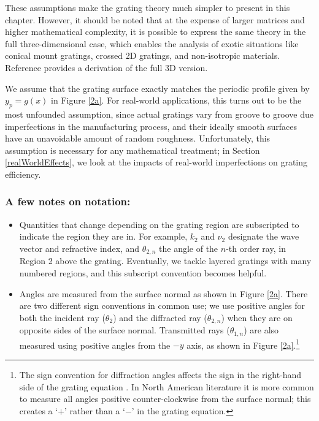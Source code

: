 These assumptions make the grating theory much simpler to present in this chapter. However, it should be noted that at the expense of larger matrices and higher mathematical complexity, it is possible to express the same theory in the full three-dimensional case, which enables the analysis of exotic situations like conical mount gratings, crossed 2D gratings, and non-isotropic materials.  Reference \cite[Chapter 5]{Nev02} provides a derivation of the full 3D version.

We assume that the grating surface exactly matches the periodic profile given by $y_p=g(x)$ in Figure \ref{2a}.  For real-world applications, this turns out to be the most unfounded assumption, since actual gratings vary from groove to groove due imperfections in the manufacturing process, and their ideally smooth surfaces have an unavoidable amount of random roughness.  Unfortunately, this assumption is necessary for any mathematical treatment; in Section \ref{realWorldEffects}, we look at the impacts of real-world  imperfections on grating efficiency.

\subsubsection{A few notes on notation:}
\begin{itemize}
\item Quantities that change depending on the grating region are subscripted to indicate the region they are in.  For example, $k_2$ and $\nu_2$ designate the wave vector and refractive index, and $\theta_{2,n}$ the angle of the $n$-th order ray, in Region 2 above the grating.  Eventually, we tackle layered gratings with many numbered regions, and this subscript convention becomes helpful.
\item Angles are measured from the surface normal as shown in Figure \ref{2a}.  There are two different sign conventions in common use; we use positive angles for both the incident ray ($\theta_2$) and the diffracted ray ($\theta_{2,n}$) when they are on opposite sides of the surface normal.  Transmitted rays ($\theta_{1,n}$) are also measured using positive angles from the $-y$ axis, as shown in Figure \ref{2a}.\footnote{The sign convention for diffraction angles affects the sign in the right-hand side of the grating equation .  In North American literature it is more common to measure all angles positive counter-clockwise from the surface normal; this creates a `$+$' rather than a `$-$' in the grating equation.}
\end{itemize}

